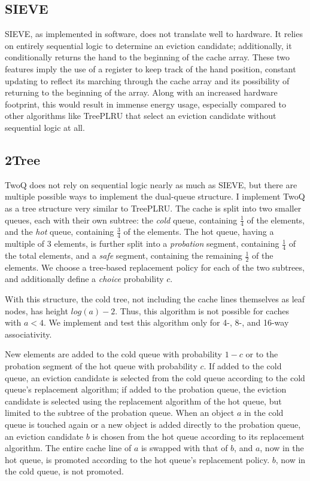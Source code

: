 \documentclass[letterpaper, twocolumn]{article}
\begin{document}
\subsection{SIEVE}

SIEVE, as implemented in software, does not translate well to hardware.
It relies on entirely sequential logic to determine an eviction candidate;
additionally, it conditionally returns the hand to the beginning of the cache array.
These two features imply the use of a register to keep track of the hand position,
constant updating to reflect its marching through the cache array
and its possibility of returning to the beginning of the array.
Along with an increased hardware footprint, this would result in immense energy usage,
especially compared to other algorithms like TreePLRU that select an eviction candidate
without sequential logic at all.

\subsection{2Tree}

TwoQ does not rely on sequential logic nearly as much as SIEVE,
but there are multiple possible ways to implement the dual-queue structure.
I implement TwoQ as a tree structure very similar to TreePLRU.
The cache is split into two smaller queues, each with their own subtree:
the \textit{cold} queue, containing $\frac{1}{4}$ of the elements,
and the \textit{hot} queue, containing $\frac{3}{4}$ of the elements.
The hot queue, having a multiple of 3 elements,
is further split into
a \textit{probation} segment, containing $\frac{1}{4}$ of the total elements,
and a \textit{safe} segment, containing the remaining $\frac{1}{2}$ of the elements.
We choose a tree-based replacement policy for each of the two subtrees,
and additionally define a \textit{choice} probability $c$.

With this structure, the cold tree,
not including the cache lines themselves as leaf nodes, has height $log(a) - 2$.
Thus, this algorithm is not possible for caches with $a < 4$.
We implement and test this algorithm only for 4-, 8-, and 16-way associativity.

New elements are added to the cold queue with probability $1 - c$
or to the probation segment of the hot queue with probability $c$.
If added to the cold queue, an eviction candidate is selected from the cold queue
according to the cold queue's replacement algorithm;
if added to the probation queue, the eviction candidate is selected using the replacement algorithm
of the hot queue, but limited to the subtree of the probation queue.
When an object $a$ in the cold queue is touched again
or a new object is added directly to the probation queue,
an eviction candidate $b$ is chosen from the hot queue according to its replacement algorithm.
The entire cache line of $a$ is swapped with that of $b$,
and $a$, now in the hot queue, is promoted according to the hot queue's replacement policy.
$b$, now in the cold queue, is not promoted.
\end{document}
